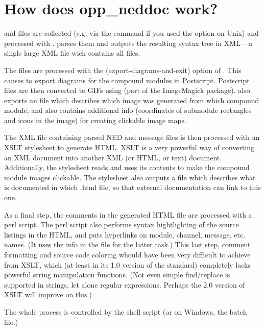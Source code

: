\section{How does opp\_neddoc work?}

 and  files are collected (e.g. via the 
command if you used the  option on Unix) and processed
with .  parses them and outputs the resulting syntax
tree in XML -- a single large XML file wich contains all files.

The  files are processed with the  (export-diagrams-and-exit)
option of . This causes  to export diagrams for the
compound modules in Postscript. Postscript files are then converted
to GIFs using  (part of the ImageMagick package).
 also exports an  file which describes which
image was generated from which compound module, and also contains
additional info (coordinates of submodule rectangles and icons in the image)
for creating clickable image maps.

The XML file containing parsed NED and message files is then processed
with an XSLT stylesheet to generate HTML. XSLT is a very powerful way
of converting an XML document into another XML (or HTML, or text) document.
Additionally, the stylesheet reads  and uses its contents
to make the compound module images clickable.
The stylesheet also outputs a  file which describes what is documented
in which .html file, so that external documentation can link to this one.

As a final step, the comments in the generated HTML file are processed
with a perl script. The perl script also performs syntax hightlighting
of the source listings in the HTML, and puts hyperlinks on module,
channel, message, etc. names. (It uses the info in the  file
for the latter task.) This last step, comment formatting and source code
coloring whould have been very difficult to achieve from XSLT, which
(at least in its 1.0 version of the standard) completely lacks powerful
string manipulation functions. (Not even simple find/replace
is supported in strings, let alone regular expressions. Perhaps the
2.0 version of XSLT will improve on this.)

The whole process is controlled by the  shell script
(or on Windows, the  batch file.)





